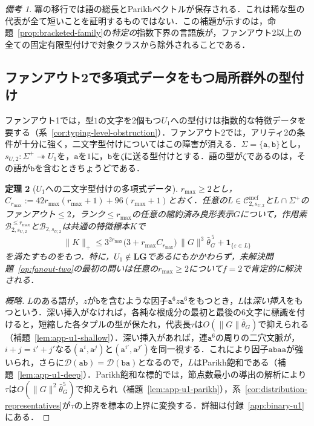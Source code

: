 \documentclass[11pt,a4paper]{ltjsarticle}
\numberwithin{equation}{section}
\theoremstyle{plain}
\newtheorem{theorem}{定理}[section]
\theoremstyle{definition}
\theoremstyle{remark}
\newtheorem{remark}[theorem]{備考}
\newcommand{\Cmcf}[2]{\mathcal{C}^{\mathrm{mcf}}_{#1,#2}}
\newcommand{\D}{\mathcal{D}}
\newcommand{\eps}{\varepsilon}
\begin{document}
\begin{remark}
冪の移行では語の総長とParikhベクトルが保存される．これは稀な型の代表が全て短いことを証明するものではない．この補題が示すのは，命題~\ref{prop:bracketed-family}の\emph{特定の}指数下界の言語族が，ファンアウト2以上の全ての固定有限型付けで対象クラスから除外されることである．
\end{remark}

\subsection{ファンアウト2で多項式データをもつ局所群外の型付け}
\label{subsec:binary-u1}

ファンアウト1では，型$1$の文字を2個もつ$U_1$への型付けは指数的な特徴データを要する（系~\ref{cor:typing-level-obstruction}）．ファンアウト2では，アリティ2の条件が十分に強く，二文字型付けについてはこの障害が消える．$\Sigma=\{\mathtt a,\mathtt b\}$とし，$s_{U,2}:\Sigma^+\twoheadrightarrow U_1$を，$\mathtt a$を$1$に，$\mathtt b$を$\zeta$に送る型付けとする．語の型が$\zeta$であるのは，その語が$\mathtt b$を含むときちょうどである．

\begin{theorem}[$U_1$への二文字型付けの多項式データ]
\label{thm:binary-u1-polydata}
$r_{\max}\ge2$とし，$C_{r_{\max}}:=42r_{\max}(r_{\max}+1)+96(r_{\max}+1)$とおく．任意の$L\in\Cmcf{2}{s_{U,2}}$と$L\cap\Sigma^+$のファンアウト$\le2$，ランク$\le r_{\max}$の任意の縮約済み良形表示$G$について，作用素$\mathcal B^{\le r_{\max}}_{2,s_{U,2}}$と$\mathcal B_{2,s_{U,2}}$は共通の特徴標本$K$で
\[
 \|K\|_+\le 3^{2r_{\max}}\bigl(3+r_{\max}C_{r_{\max}}\bigr)\,
 \|G\|^3\bar\theta_G^{\,5}+\mathbf 1_{\{\eps\in L\}}
\]
を満たすものをもつ．特に，$U_1\notin\mathbf{LG}$であるにもかかわらず，未解決問題~\ref{op:fanout-two}の最初の問いは任意の$r_{\max}\ge2$について$f=2$で肯定的に解決される．
\end{theorem}

\begin{proof}[概略]
$L$のある語が，$z$が$\mathtt b$を含むような因子$\mathtt a^6z\mathtt a^6$をもつとき，$L$は\emph{深い挿入}をもつという．深い挿入がなければ，各純な根成分の最初と最後の6文字に標識を付けると，短縮した各タプルの型が保たれ，代表長$\tau$は$O(\|G\|\bar\theta_G)$で抑えられる（補題~\ref{lem:app-u1-shallow}）．深い挿入があれば，連$\mathtt a^6$の周りの二穴文脈が，$i+j=i'+j'$なる$(\mathtt a^i,\mathtt a^j)$と$(\mathtt a^{i'},\mathtt a^{j'})$を同一視する．これにより因子$\mathtt a\mathtt b\mathtt a\mathtt a$が強いられ，さらに$\D(\mathtt{ab})=\D(\mathtt{ba})$となるので，$L$はParikh飽和である（補題~\ref{lem:app-u1-deep}）．Parikh飽和な標的では，節点数最小の導出の解析により$\tau$は$O(\|G\|^2\bar\theta_G^5)$で抑えられ（補題~\ref{lem:app-u1-parikh}），系~\ref{cor:distribution-representatives}が$\tau$の上界を標本の上界に変換する．詳細は付録~\ref{app:binary-u1}にある．
\end{proof}
\end{document}
